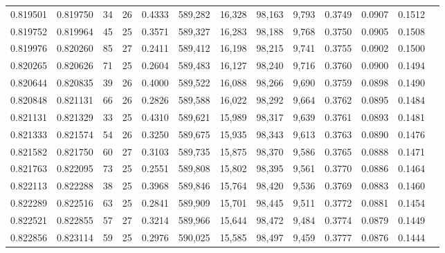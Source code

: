 \begin{tabular}{rrrrrrrrrrrrr}
0.819501 & 0.819750 &    34 &  26 &                                     0.4333 & 589,282 &  16,328 &  98,163 &   9,793 & 0.3749 & 0.0907 & 0.1512 \\
0.819752 & 0.819964 &    45 &  25 &                                     0.3571 & 589,327 &  16,283 &  98,188 &   9,768 & 0.3750 & 0.0905 & 0.1508 \\
0.819976 & 0.820260 &    85 &  27 &                                     0.2411 & 589,412 &  16,198 &  98,215 &   9,741 & 0.3755 & 0.0902 & 0.1500 \\
0.820265 & 0.820626 &    71 &  25 &                                     0.2604 & 589,483 &  16,127 &  98,240 &   9,716 & 0.3760 & 0.0900 & 0.1494 \\
0.820644 & 0.820835 &    39 &  26 &                                     0.4000 & 589,522 &  16,088 &  98,266 &   9,690 & 0.3759 & 0.0898 & 0.1490 \\
0.820848 & 0.821131 &    66 &  26 &                                     0.2826 & 589,588 &  16,022 &  98,292 &   9,664 & 0.3762 & 0.0895 & 0.1484 \\
0.821131 & 0.821329 &    33 &  25 &                                     0.4310 & 589,621 &  15,989 &  98,317 &   9,639 & 0.3761 & 0.0893 & 0.1481 \\
0.821333 & 0.821574 &    54 &  26 &                                     0.3250 & 589,675 &  15,935 &  98,343 &   9,613 & 0.3763 & 0.0890 & 0.1476 \\
0.821582 & 0.821750 &    60 &  27 &                                     0.3103 & 589,735 &  15,875 &  98,370 &   9,586 & 0.3765 & 0.0888 & 0.1471 \\
0.821763 & 0.822095 &    73 &  25 &                                     0.2551 & 589,808 &  15,802 &  98,395 &   9,561 & 0.3770 & 0.0886 & 0.1464 \\
0.822113 & 0.822288 &    38 &  25 &                                     0.3968 & 589,846 &  15,764 &  98,420 &   9,536 & 0.3769 & 0.0883 & 0.1460 \\
0.822289 & 0.822516 &    63 &  25 &                                     0.2841 & 589,909 &  15,701 &  98,445 &   9,511 & 0.3772 & 0.0881 & 0.1454 \\
0.822521 & 0.822855 &    57 &  27 &                                     0.3214 & 589,966 &  15,644 &  98,472 &   9,484 & 0.3774 & 0.0879 & 0.1449 \\
0.822856 & 0.823114 &    59 &  25 &                                     0.2976 & 590,025 &  15,585 &  98,497 &   9,459 & 0.3777 & 0.0876 & 0.1444 \\

\end{tabular}
